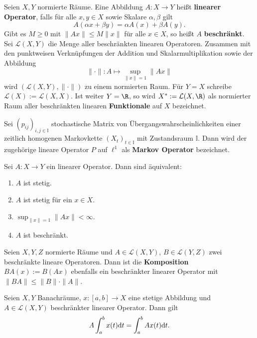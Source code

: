 \begin{defi}
  Seien $X,Y$ normierte Räume. Eine Abbildung $A\colon X\to Y$ heißt \textbf{linearer Operator}, falls für alle $x,y\in X$ sowie Skalare $\alpha,\beta$ gilt $$A(\alpha x+\beta y)=\alpha A(x)+\beta A(y).$$ 
  Gibt es $M\geq0$ mit $\|Ax\|\leq M\|x\|$ für alle $x\in X$, so heißt $A$ \textbf{beschränkt}. Sei $\mathcal L(X,Y)$ die Menge aller beschränkten linearen Operatoren. Zusammen mit den punktweisen Verknüpfungen der Addition und Skalarmultiplikation sowie der Abbildung $$\|\cdot\|\colon A\mapsto \sup_{\|x\|=1}\|Ax\|$$ wird $(\mathcal L(X,Y),\|\cdot\|)$ zu einem normierten Raum. Für $Y=X$ schreibe $\mathcal L(X):=\mathcal L(X,X)$. Ist weiter $Y=\R$, so wird $X^*:=\mathcal L(X,\R)$ als normierter Raum aller beschränkten linearen \textbf{Funktionale} auf $X$ bezeichnet.
\end{defi}

\begin{defi}
  Sei $(p_{ij})_{i,j\in\mathbb I}$ stochastische Matrix von Übergangswahrscheinlichkeiten einer zeitlich homogenen Markovkette $(X_t)_{t\in\mathbb I}$ mit Zustandsraum $\mathbb I$. Dann wird der zugehörige lineare Operator $P$ auf $\ell^1$ als \textbf{Markov Operator} bezeichnet. 
\end{defi}



\begin{satz}
  Sei $A\colon X\to Y$ ein linearer Operator. Dann sind äquivalent:
  \begin{enumerate}
      \item $A$ ist stetig.
      \item $A$ ist stetig für ein $x\in X$.
      \item $\sup_{\|x\|=1}\|Ax\|<\infty$.
      \item $A$ ist beschränkt.
  \end{enumerate}
\end{satz}




\begin{prop}
  Seien $X,Y,Z$ normierte Räume und  $A\in\mathcal L(X,Y)$, $B\in\mathcal L(Y,Z)$ zwei beschränkte lineare Operatoren. Dann ist die \textbf{Komposition} $BA(x):=B(Ax)$ ebenfalls  ein beschränkter linearer Operator mit $\|BA\|\leq \|B\|\cdot\|A\|$.
\end{prop}

\begin{prop}
  Seien $X,Y$ Banachräume, $x\colon[a,b]\to X$ eine stetige Abbildung und $A\in\mathcal L (X,Y)$ beschränkter linearer Operator. Dann gilt $$A\int_a^b x(t)\text dt=\int_a^b Ax(t)\text dt.$$
\end{prop}


